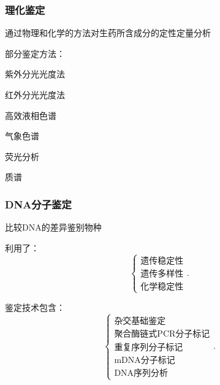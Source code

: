 \subsubsection*{理化鉴定}%
\label{subsub:理化鉴定}
通过物理和化学的方法对生药所含成分的定性定量分析
\begin{notation}
    部分鉴定方法：

    紫外分光光度法

    红外分光光度法

    高效液相色谱

    气象色谱

    荧光分析

    质谱
\end{notation}
\subsubsection*{DNA分子鉴定}%
\label{subsub:DNA分子鉴定}
比较DNA的差异鉴别物种
\begin{notation}
    利用了：
    \[
        \begin{cases}
            \text{遗传稳定性}\\ 
            \text{遗传多样性}\\ 
            \text{化学稳定性}
        \end{cases}
    .\] 
\end{notation}
鉴定技术包含：
\[
    \begin{cases}
        \text{杂交基础鉴定}\\ 
        \text{聚合酶链式PCR分子标记}\\ 
        \text{重复序列分子标记}\\ 
        \text{mDNA分子标记}\\ 
        \text{DNA序列分析}
    \end{cases}
.\] 
